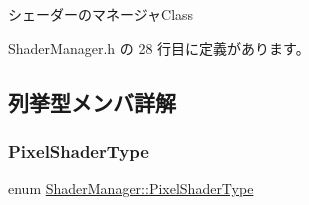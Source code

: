 シェーダーのマネージャ\+Class 

 Shader\+Manager.\+h の 28 行目に定義があります。



\subsection{列挙型メンバ詳解}
\mbox{\label{class_shader_manager_a7d15d773b3c6a99dd7086c45c8b0be5f}} 
\subsubsection{\texorpdfstring{Pixel\+Shader\+Type}{PixelShaderType}}
{\footnotesize\ttfamily enum \mbox{\hyperlink{class_shader_manager_a7d15d773b3c6a99dd7086c45c8b0be5f}{Shader\+Manager\+::\+Pixel\+Shader\+Type}}\hspace{0.3cm}{\ttfamily [strong]}}

